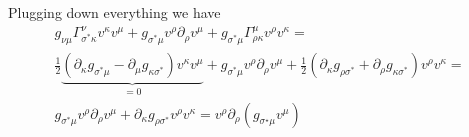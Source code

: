 %
Plugging down everything we have
%
\begin{multline}
    g_{\nu \mu} \Gamma_{\sigma^\ast \kappa}^{\nu} v^\kappa  v^\mu +
    g_{\sigma^\ast \mu}  v^\rho \partial_\rho v^\mu + 
    g_{\sigma^\ast \mu} \Gamma_{\rho \kappa}^{\mu} v^\rho v^\kappa = \\
    \frac{1}{2} \underbrace{(\partial_\kappa g_{{\sigma^\ast}\mu} - 
    \partial_\mu g_{\kappa{\sigma^\ast}}) v^\kappa  v^\mu }_{ = 0} +
    g_{\sigma^\ast \mu}  v^\rho \partial_\rho v^\mu + 
    \frac{1}{2} (\partial_\kappa g_{{\rho}\sigma^\ast} +
    \partial_{\rho} g_{\kappa\sigma^\ast})  v^\rho v^\kappa = \\
    g_{\sigma^\ast \mu}  v^\rho \partial_\rho v^\mu + 
    \partial_\kappa g_{{\rho}\sigma^\ast} v^\rho v^\kappa = 
    v^\rho \partial_\rho \left(g_{\sigma^{\star}\mu}v^\mu\right)
\end{multline}
